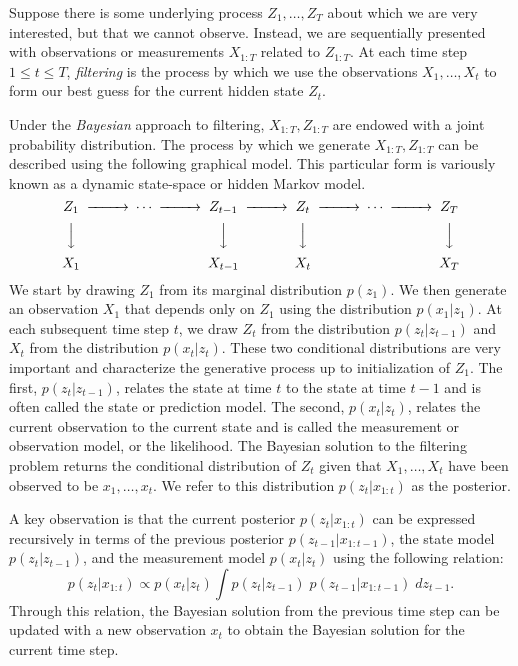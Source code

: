 
Suppose there is some underlying process $Z_1,\dotsc,Z_T$ about which we are very interested, but that we cannot observe.  Instead, we are sequentially presented with observations or measurements $X_{1:T}$ related to $Z_{1:T}$.  At each time step $1\leq t\leq T$, \emph{filtering} is the process by which we use the observations $X_1,\dotsc, X_t$ to form our best guess for the current hidden state $Z_t$.

Under the \emph{Bayesian} approach to filtering, $X_{1:T},Z_{1:T}$ are endowed with a joint probability distribution.  The process by which we generate $X_{1:T},Z_{1:T}$ can be described using the following graphical model.  This particular form is variously known as a dynamic state-space or hidden Markov model.
\[
\begin{CD}
Z_1 @>>> \cdots @>>>  Z_{t-1} @>>> Z_t @>>> \cdots  @>>> Z_T \\
@VVV @.	@VVV @VVV @. @VVV \\
X_1  @. @. X_{t-1} @. X_t @. @. X_T
\end{CD}
\]
We start by drawing $Z_1$ from its marginal distribution $p(z_1)$.  We then generate an observation $X_1$ that depends only on $Z_1$ using the distribution $p(x_1|z_1)$.  At each subsequent time step $t$, we draw $Z_t$ from the distribution $p(z_t|z_{t-1})$ and $X_t$ from the distribution $p(x_t|z_t)$.  These two conditional distributions are very important and characterize the generative process up to initialization of $Z_1$.  The first, $p(z_t|z_{t-1})$, relates the state at time $t$ to the state at time $t-1$ and is often called the state or prediction model.  The second, $p(x_t|z_t)$, relates the current observation to the current state and is called the measurement or observation model, or the likelihood.  The Bayesian solution to the filtering problem returns the conditional distribution of $Z_t$ given that $X_1,\dotsc,X_t$ have been observed to be $x_1,\dotsc,x_t$.  We refer to this distribution $p(z_t|x_{1:t})$ as the posterior.

A key observation is that the current posterior $p(z_t|x_{1:t})$ can be expressed recursively in terms of the previous posterior $p(z_{t-1}|x_{1:t-1})$, the state model $p(z_t|z_{t-1})$, and the measurement model $p(x_t|z_t)$ using the following relation:
\begin{equation}\label{eq:ck}
p(z_t|x_{1:t}) \propto p(x_t|z_t) \int p(z_t|z_{t-1})\; p(z_{t-1}|x_{1:t-1}) \; dz_{t-1}.
\end{equation}
Through this relation, the Bayesian solution from the previous time step can be updated with a new observation $x_t$ to obtain the Bayesian solution for the current time step.

